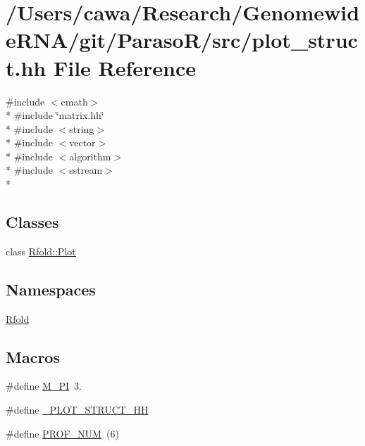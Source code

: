 \hypertarget{plot__struct_8hh}{\section{/\+Users/cawa/\+Research/\+Genomewide\+R\+N\+A/git/\+Paraso\+R/src/plot\+\_\+struct.hh File Reference}
\label{plot__struct_8hh}
}
{\ttfamily \#include $<$cmath$>$}\\*
{\ttfamily \#include \char`\"{}matrix.\+hh\char`\"{}}\\*
{\ttfamily \#include $<$string$>$}\\*
{\ttfamily \#include $<$vector$>$}\\*
{\ttfamily \#include $<$algorithm$>$}\\*
{\ttfamily \#include $<$sstream$>$}\\*
\subsection*{Classes}
\begin{DoxyCompactItemize}
\item 
class \hyperlink{class_rfold_1_1_plot}{Rfold\+::\+Plot}
\end{DoxyCompactItemize}
\subsection*{Namespaces}
\begin{DoxyCompactItemize}
\item 
 \hyperlink{namespace_rfold}{Rfold}
\end{DoxyCompactItemize}
\subsection*{Macros}
\begin{DoxyCompactItemize}
\item 
\#define \hyperlink{plot__struct_8hh_ae71449b1cc6e6250b91f539153a7a0d3}{M\+\_\+\+P\+I}~3.
\item 
\#define \hyperlink{plot__struct_8hh_afe4893d33e9cf48f7d08ced2701141a8}{\+\_\+\+P\+L\+O\+T\+\_\+\+S\+T\+R\+U\+C\+T\+\_\+\+H\+H}
\item 
\#define \hyperlink{plot__struct_8hh_a2157e7b8a768152a4baebc430cdbe941}{P\+R\+O\+F\+\_\+\+N\+U\+M}~(6)
\end{DoxyCompactItemize}


